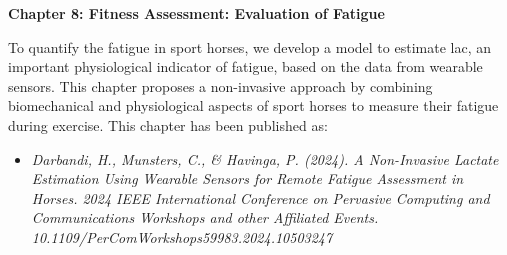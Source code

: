 \noindent\textbf{Chapter 8: Fitness Assessment: Evaluation of Fatigue}

\noindent To quantify the fatigue in sport horses, we develop a model to estimate \gls{lac}, an important physiological indicator of fatigue, based on the data from wearable sensors. This chapter proposes a non-invasive approach by combining biomechanical and physiological aspects of sport horses to measure their fatigue during exercise. This chapter has been published as:
\begin{itemize}
\item[]\begin{footnotesize} \textit{Darbandi, H., Munsters, C., \& Havinga, P. (2024). A Non-Invasive Lactate Estimation Using Wearable Sensors for Remote Fatigue Assessment in Horses. 2024 IEEE International Conference on Pervasive Computing and Communications Workshops and other Affiliated Events. 10.1109/PerComWorkshops59983.2024.10503247}
\end{footnotesize} 
\end{itemize}